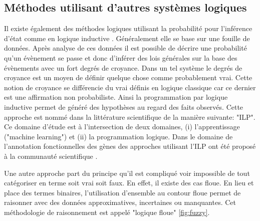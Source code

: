 \begin{refsegment}
    \subsection{Méthodes utilisant d'autres systèmes logiques }
    
    Il existe également des méthodes logiques utilisant la probabilité pour l'inférence d'état comme en logique inductive \cite{michalski1983theory,muggleton1994inductive}. Généralement elle se base sur une fouille de données. Après analyse de ces données il est possible de décrire une probabilité qu'un évènement se passe et donc d'inférer des lois générales sur la base des évènements avec un fort degrés de croyance. Dans un tel système le degrés de croyance est un moyen de définir quelque chose comme probablement vrai. Cette notion de croyance se différencie du vrai définis en logique classique car ce dernier est une affirmation non probabiliste. Ainsi la programmation par logique inductive permet de généré des hypothèses au regard des faits observés. Cette approche est nommé dans la littérature scientifique de la manière suivante: "\gls{ILP}". Ce domaine d'étude est à l'intersection de deux domaines, (i) l'apprentissage ("machine learning") et (ii) la programmation logique. Dans le domaine de l'annotation fonctionnelles des gènes des approches utilisant l'\gls{ILP} ont été proposé à la communauté scientifique \cite{clare2003predicting,king2004applying}.
    
    Une autre approche part du principe qu'il est compliqué voir impossible de tout catégoriser en terme soit vrai soit faux. En effet, il existe des cas floue. En lieu et place des termes binaires, l'utilisation d'ensemble au contour floue permet de raisonner avec des données approximatives, incertaines ou manquantes. Cet méthodologie de raisonnement est appelé "logique floue" \ref{fig:fuzzy}.
        

\end{refsegment}
